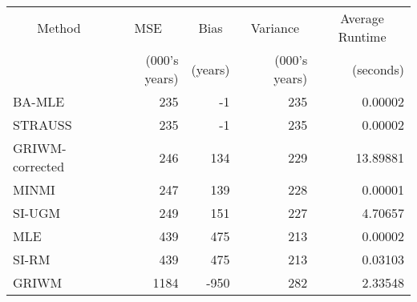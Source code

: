 
\begin{tabular}{lrrrr}
\toprule
\multicolumn{1}{c}{Method} & \multicolumn{1}{c}{MSE} & \multicolumn{1}{c}{Bias} & \multicolumn{1}{c}{Variance} & \multicolumn{1}{c}{Average Runtime} \\
\cmidrule(l{3pt}r{3pt}){1-1} \cmidrule(l{3pt}r{3pt}){2-2} \cmidrule(l{3pt}r{3pt}){3-3} \cmidrule(l{3pt}r{3pt}){4-4} \cmidrule(l{3pt}r{3pt}){5-5}
 & (000's years) & (years) & (000's years) & (seconds)\\
\midrule
BA-MLE & 235 & -1 & 235 & 0.00002\\
STRAUSS & 235 & -1 & 235 & 0.00002\\
GRIWM-corrected & 246 & 134 & 229 & 13.89881\\
MINMI & 247 & 139 & 228 & 0.00001\\
SI-UGM & 249 & 151 & 227 & 4.70657\\
\addlinespace
MLE & 439 & 475 & 213 & 0.00002\\
SI-RM & 439 & 475 & 213 & 0.03103\\
GRIWM & 1184 & -950 & 282 & 2.33548\\
\bottomrule
\end{tabular}
